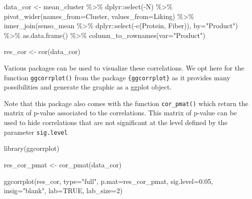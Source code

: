\documentclass[
]{book}
\newenvironment{Shaded}{\begin{snugshade}}{\end{snugshade}}
\newcommand{\AttributeTok}[1]{\textcolor[rgb]{0.77,0.63,0.00}{#1}}
\newcommand{\ConstantTok}[1]{\textcolor[rgb]{0.00,0.00,0.00}{#1}}
\newcommand{\DecValTok}[1]{\textcolor[rgb]{0.00,0.00,0.81}{#1}}
\newcommand{\FloatTok}[1]{\textcolor[rgb]{0.00,0.00,0.81}{#1}}
\newcommand{\FunctionTok}[1]{\textcolor[rgb]{0.00,0.00,0.00}{#1}}
\newcommand{\NormalTok}[1]{#1}
\newcommand{\OtherTok}[1]{\textcolor[rgb]{0.56,0.35,0.01}{#1}}
\newcommand{\SpecialCharTok}[1]{\textcolor[rgb]{0.00,0.00,0.00}{#1}}
\newcommand{\StringTok}[1]{\textcolor[rgb]{0.31,0.60,0.02}{#1}}
\begin{document}
\begin{Shaded}
\begin{Highlighting}[]
\NormalTok{data\_cor }\OtherTok{\textless{}{-}}\NormalTok{ mean\_cluster }\SpecialCharTok{\%\textgreater{}\%} 
\NormalTok{  dplyr}\SpecialCharTok{::}\FunctionTok{select}\NormalTok{(}\SpecialCharTok{{-}}\NormalTok{N) }\SpecialCharTok{\%\textgreater{}\%} 
  \FunctionTok{pivot\_wider}\NormalTok{(}\AttributeTok{names\_from=}\NormalTok{Cluster, }\AttributeTok{values\_from=}\NormalTok{Liking) }\SpecialCharTok{\%\textgreater{}\%} 
  \FunctionTok{inner\_join}\NormalTok{(senso\_mean }\SpecialCharTok{\%\textgreater{}\%}\NormalTok{ dplyr}\SpecialCharTok{::}\FunctionTok{select}\NormalTok{(}\SpecialCharTok{{-}}\FunctionTok{c}\NormalTok{(Protein, Fiber)), }\AttributeTok{by=}\StringTok{"Product"}\NormalTok{) }\SpecialCharTok{\%\textgreater{}\%} 
  \FunctionTok{as.data.frame}\NormalTok{() }\SpecialCharTok{\%\textgreater{}\%} 
  \FunctionTok{column\_to\_rownames}\NormalTok{(}\AttributeTok{var=}\StringTok{"Product"}\NormalTok{)}

\NormalTok{res\_cor }\OtherTok{\textless{}{-}} \FunctionTok{cor}\NormalTok{(data\_cor)}
\end{Highlighting}
\end{Shaded}

Various packages can be used to visualize these correlations. We opt here for the function \texttt{ggcorrplot()} from the package \texttt{\{ggcorrplot\}} as it provides many possibilities and generate the graphic as a ggplot object.

Note that this package also comes with the function \texttt{cor\_pmat()} which return the matrix of p-value associated to the correlations. This matrix of p-value can be used to hide correlations that are not significant at the level defined by the parameter \texttt{sig.level}

\begin{Shaded}
\begin{Highlighting}[]
\FunctionTok{library}\NormalTok{(ggcorrplot)}

\NormalTok{res\_cor\_pmat }\OtherTok{\textless{}{-}} \FunctionTok{cor\_pmat}\NormalTok{(data\_cor)}

\FunctionTok{ggcorrplot}\NormalTok{(res\_cor, }\AttributeTok{type=}\StringTok{"full"}\NormalTok{, }\AttributeTok{p.mat=}\NormalTok{res\_cor\_pmat, }\AttributeTok{sig.level=}\FloatTok{0.05}\NormalTok{, }\AttributeTok{insig=}\StringTok{"blank"}\NormalTok{, }\AttributeTok{lab=}\ConstantTok{TRUE}\NormalTok{, }\AttributeTok{lab\_size=}\DecValTok{2}\NormalTok{)}
\end{Highlighting}
\end{Shaded}
\end{document}
